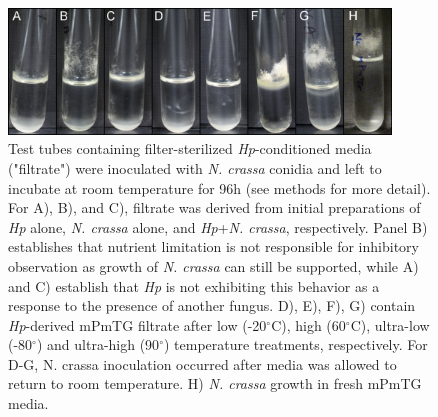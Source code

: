 \begin{figure}[hb]
  \centering
  \includegraphics[width=4in]{./Chapter_Inhibition/img/96h_HpNcColdHotFresh.png}
  \caption[Filter-sterilized \textit{Hp}-conditioned media effectively inhibits \textit{N. crassa} growth.]{Test tubes containing filter-sterilized \textit{Hp}-conditioned media ("filtrate") were inoculated with \textit{N. crassa} conidia and left to incubate at room temperature for 96h (see methods for more detail). For A), B), and C), filtrate was derived from initial preparations of \textit{Hp} alone, \textit{N. crassa} alone, and \textit{Hp}+\textit{N. crassa}, respectively. Panel B) establishes that nutrient limitation is not responsible for inhibitory observation as growth of \textit{N. crassa} can still be supported, while A) and C) establish that \textit{Hp} is not exhibiting this behavior as a response to the presence of another fungus. D), E), F), G) contain \textit{Hp}-derived mPmTG filtrate after low (-20$^{\circ}$C), high (60$^{\circ}$C), ultra-low (-80$^{\circ}$) and ultra-high (90$^{\circ}$) temperature treatments, respectively. For D-G, N. crassa inoculation occurred after media was allowed to return to room temperature. H) \textit{N. crassa} growth in fresh mPmTG media.}
  \label{fig:ChInhib_FilterTempAssay}
\end{figure}

